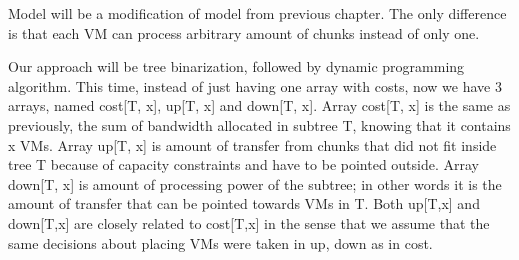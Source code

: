Model will be a modification of model from previous chapter. The only
difference is that each VM can process arbitrary amount of chunks
instead of only one.

Our approach will be tree binarization, followed by dynamic
programming algorithm. This time, instead of just having one array
with costs, now we have 3 arrays, named cost[T, x], up[T, x] and
down[T, x]. Array cost[T, x] is the
same as previously, the sum of bandwidth allocated in subtree T,
knowing that it contains x VMs. Array up[T, x] is amount of transfer
from chunks that did not fit inside tree T because of capacity
constraints and have to be pointed outside. Array down[T, x] is amount
of processing power of the subtree; in other words it is the amount of
transfer that can be pointed towards VMs in T. Both up[T,x] and
down[T,x] are closely related to cost[T,x] in the sense that we assume
that the same decisions about placing VMs were taken in up, down as in
cost.

